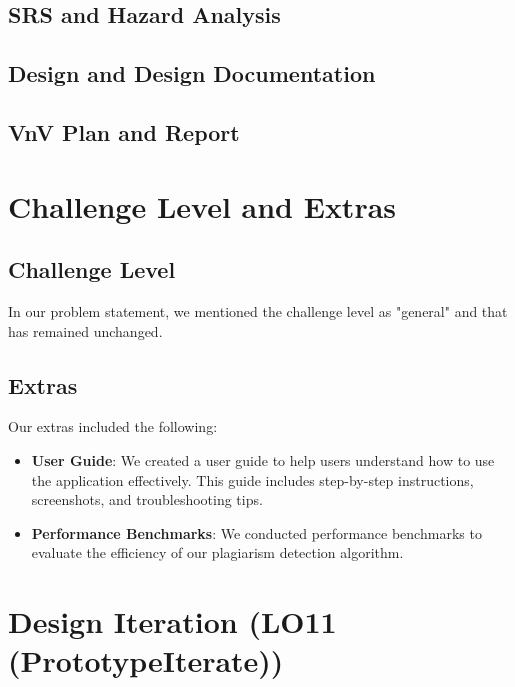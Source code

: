 \documentclass{article}
\begin{document}

\subsection{SRS and Hazard Analysis}

\subsection{Design and Design Documentation}

\subsection{VnV Plan and Report}

\section{Challenge Level and Extras}

\subsection{Challenge Level}

In our problem statement, we mentioned the challenge level as "general" and that has remained unchanged.

\subsection{Extras}
Our extras included the following:

\begin{itemize}
    \item \textbf{User Guide}: We created a user guide to help users understand how to use the application effectively. This guide includes step-by-step instructions, screenshots, and troubleshooting tips.
    \item \textbf{Performance Benchmarks}: We conducted performance benchmarks to evaluate the efficiency of our plagiarism detection algorithm.
\end{itemize}

\section{Design Iteration (LO11 (PrototypeIterate))}
\end{document}
